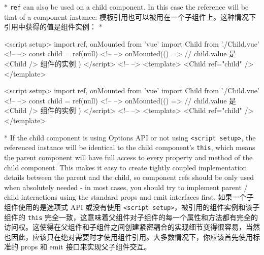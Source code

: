 \begin{paracol}{2}
\switchcolumn[0]*%
\texttt{ref} can also be used on a child component. In this case the
reference will be that of a component instance:
\switchcolumn
模板引用也可以被用在一个子组件上。这种情况下引用中获得的值是组件实例：
\switchcolumn[0]*%
\begin{codeHtml}
<script setup>
import { ref, onMounted } from 'vue'
import Child from './Child.vue'
<!-- -->
const child = ref(null)
<!-- -->
onMounted(() => {
  // child.value 是 <Child /> 组件的实例
})
</script>
<!-- -->
<template>
  <Child ref="child" />
</template>
\end{codeHtml}
\switchcolumn
\begin{codeHtml}
<script setup>
import { ref, onMounted } from 'vue'
import Child from './Child.vue'
<!-- -->
const child = ref(null)
<!-- -->
onMounted(() => {
  // child.value 是 <Child /> 组件的实例
})
</script>
<!-- -->
<template>
  <Child ref="child" />
</template>
\end{codeHtml}
\switchcolumn[0]*%
If the child component is using Options API or not using
\texttt{\textless{}script\ setup\textgreater{}}, the referenced instance
will be identical to the child component's \texttt{this}, which means
the parent component will have full access to every property and method
of the child component. This makes it easy to create tightly coupled
implementation details between the parent and the child, so component
refs should be only used when absolutely needed - in most cases, you
should try to implement parent / child interactions using the standard
props and emit interfaces first.
\switchcolumn
如果一个子组件使用的是选项式 API 或没有使用
\texttt{\textless{}script\ setup\textgreater{}}，被引用的组件实例和该子组件的
\texttt{this}
完全一致，这意味着父组件对子组件的每一个属性和方法都有完全的访问权。这使得在父组件和子组件之间创建紧密耦合的实现细节变得很容易，当然也因此，应该只在绝对需要时才使用组件引用。大多数情况下，你应该首先使用标准的
props 和 emit 接口来实现父子组件交互。



\end{paracol}
